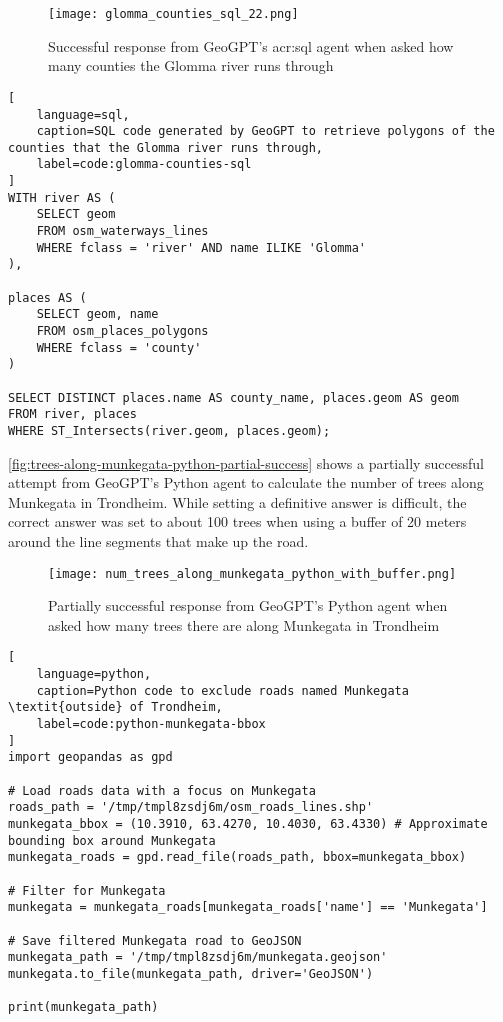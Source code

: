 \begin{figure}[h]
    \centering
    \texttt{[image: glomma\_counties\_sql\_22.png]}
    \caption{Successful response from GeoGPT's \acrshort{acr:sql} agent when asked how many counties the Glomma river runs through}
    \label{fig:glomma-counties-sql-successful}
\end{figure}

\begin{lstlisting}[
    language=sql,
    caption=SQL code generated by GeoGPT to retrieve polygons of the counties that the Glomma river runs through,
    label=code:glomma-counties-sql
]
WITH river AS (
    SELECT geom 
    FROM osm_waterways_lines 
    WHERE fclass = 'river' AND name ILIKE 'Glomma'
),

places AS (
    SELECT geom, name 
    FROM osm_places_polygons 
    WHERE fclass = 'county'
)

SELECT DISTINCT places.name AS county_name, places.geom AS geom
FROM river, places
WHERE ST_Intersects(river.geom, places.geom);    
\end{lstlisting}

\autoref{fig:trees-along-munkegata-python-partial-success} shows a partially successful attempt from GeoGPT's Python agent to calculate the number of trees along Munkegata in Trondheim. While setting a definitive answer is difficult, the correct answer was set to about 100 trees when using a buffer of 20 meters around the line segments that make up the road.

\begin{figure}[h]
    \centering
    \texttt{[image: num\_trees\_along\_munkegata\_python\_with\_buffer.png]}
    \caption{Partially successful response from GeoGPT's Python agent when asked how many trees there are along Munkegata in Trondheim}
    \label{fig:trees-along-munkegata-python-partial-success}
\end{figure}

\begin{lstlisting}[
    language=python,
    caption=Python code to exclude roads named Munkegata \textit{outside} of Trondheim,
    label=code:python-munkegata-bbox
]
import geopandas as gpd

# Load roads data with a focus on Munkegata
roads_path = '/tmp/tmpl8zsdj6m/osm_roads_lines.shp'
munkegata_bbox = (10.3910, 63.4270, 10.4030, 63.4330) # Approximate bounding box around Munkegata
munkegata_roads = gpd.read_file(roads_path, bbox=munkegata_bbox)

# Filter for Munkegata
munkegata = munkegata_roads[munkegata_roads['name'] == 'Munkegata']

# Save filtered Munkegata road to GeoJSON
munkegata_path = '/tmp/tmpl8zsdj6m/munkegata.geojson'
munkegata.to_file(munkegata_path, driver='GeoJSON')

print(munkegata_path)
\end{lstlisting}

